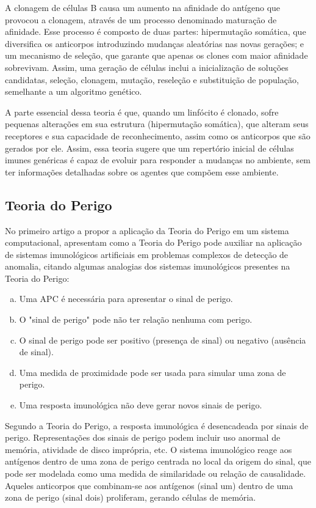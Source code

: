 A clonagem de células B causa um aumento na afinidade do antígeno que provocou a clonagem, através de um processo denominado maturação de afinidade. Esse processo é composto de duas partes: hipermutação somática, que diversifica os anticorpos introduzindo mudanças aleatórias nas novas gerações; e um mecanismo de seleção, que garante que apenas os clones com maior afinidade sobrevivam. Assim, uma geração de células inclui a inicialização de soluções candidatas, seleção, clonagem, mutação, reseleção e substituição de população, semelhante a um algoritmo genético.

A parte essencial dessa teoria é que, quando um linfócito é clonado, sofre pequenas alterações em sua estrutura (hipermutação somática), que alteram seus receptores e sua capacidade de reconhecimento, assim como os anticorpos que são gerados por ele. Assim, essa teoria sugere que um repertório inicial de células imunes genéricas é capaz de evoluir para responder a mudanças no ambiente, sem ter informações detalhadas sobre os agentes que compõem esse ambiente.

\subsection{Teoria do Perigo}

No primeiro artigo a propor a aplicação da Teoria do Perigo em um sistema computacional, \citet{Aickelin2002} apresentam como a Teoria do Perigo pode auxiliar na aplicação de sistemas imunológicos artificiais em problemas complexos de detecção de anomalia, citando algumas analogias dos sistemas imunológicos presentes na Teoria do Perigo:

\begin{enumerate}[a)]
    \item Uma APC é necessária para apresentar o sinal de perigo.
    \item O "sinal de perigo" pode não ter relação nenhuma com perigo.
    \item O sinal de perigo pode ser positivo (presença de sinal) ou negativo (ausência de sinal).
    \item Uma medida de proximidade pode ser usada para simular uma zona de perigo.
    \item Uma resposta imunológica não deve gerar novos sinais de perigo.
\end{enumerate}

Segundo a Teoria do Perigo, a resposta imunológica é desencadeada por sinais de perigo. Representações dos sinais de perigo podem incluir uso anormal de memória, atividade de disco imprópria, etc. O sistema imunológico reage aos antígenos dentro de uma zona de perigo centrada no local da origem do sinal, que pode ser modelada como uma medida de similaridade ou relação de causalidade. Aqueles anticorpos que combinam-se aos antígenos (sinal um) dentro de uma zona de perigo (sinal dois) proliferam, gerando células de memória.

